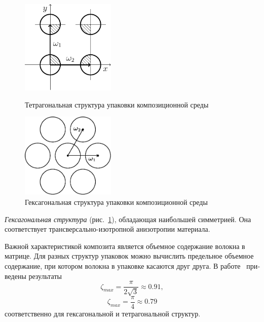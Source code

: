 \begin{russian}
\begin{figure}[h!]
\centering\footnotesize
\parbox[b]{7.5cm}{\centering\includegraphics[width=4.5cm]{tetrahon.pdf}
\caption{Тетрагональная структура упаковки композиционной среды
\label{f:7:3}}}\hfil\hfil
\parbox[b]{7.5cm}{\centering\includegraphics[width=4.5cm]{hexagonal-centroid-structure.pdf}
\caption{Гексагональная структура упаковки композиционной среды
\label{f:7:4}}}
\end{figure}


\textit{Гексагональная структура} (рис.~\ref{f:7:4}), обладающая наибольшей симметрией. Она соответствует трансверсально-изотропной анизотропии материала.


Важной характеристикой композита является объемное содержание волокна в матрице. Для разных структур упаковок можно вычислить предельное объемное содержание, при котором волокна в упаковке касаются друг друга. В работе~\cite{Vanin1985} приведены результаты
$$
\zeta_{max}=\frac{\pi}{2\sqrt{3}}\approx 0.91,
$$
$$
\zeta_{max}=\frac{\pi}{4}\approx 0.79
$$
соответственно для гексагональной и тетрагональной структур.


\end{russian}
